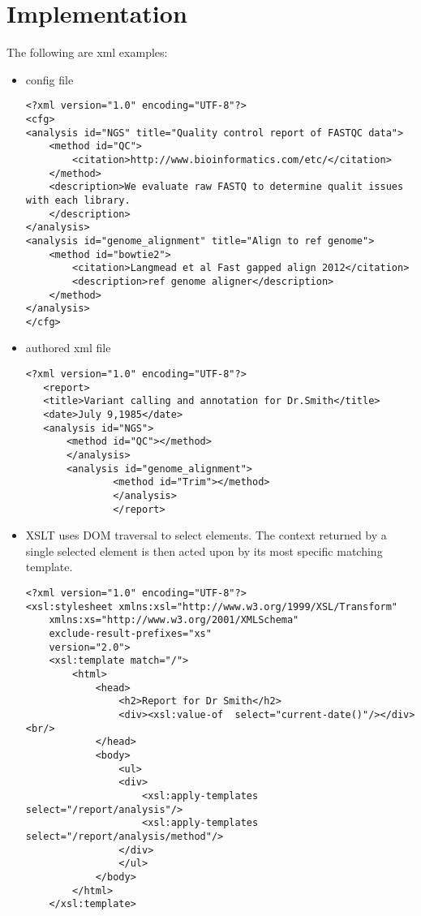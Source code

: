 \documentclass{article}
\begin{document}
\section{Implementation}
The following are xml examples:
\begin{itemize}
\item config file
\begin{lstlisting}
<?xml version="1.0" encoding="UTF-8"?>
<cfg>
<analysis id="NGS" title="Quality control report of FASTQC data">
    <method id="QC">
        <citation>http://www.bioinformatics.com/etc/</citation>
    </method>
    <description>We evaluate raw FASTQ to determine qualit issues with each library.
    </description>
</analysis>
<analysis id="genome_alignment" title="Align to ref genome">
    <method id="bowtie2">
        <citation>Langmead et al Fast gapped align 2012</citation>
        <description>ref genome aligner</description>
    </method>
</analysis>
</cfg>
\end{lstlisting}
\item authored xml file
\begin{lstlisting}
<?xml version="1.0" encoding="UTF-8"?>
   <report>
   <title>Variant calling and annotation for Dr.Smith</title>
   <date>July 9,1985</date>
   <analysis id="NGS">
       <method id="QC"></method>
       </analysis>
       <analysis id="genome_alignment">
               <method id="Trim"></method>
               </analysis>     
               </report>
\end{lstlisting}

\item XSLT uses DOM traversal to select elements.  The context returned by a single selected element is then acted upon by its most specific matching template.
\begin{lstlisting}
<?xml version="1.0" encoding="UTF-8"?>
<xsl:stylesheet xmlns:xsl="http://www.w3.org/1999/XSL/Transform"
    xmlns:xs="http://www.w3.org/2001/XMLSchema"
    exclude-result-prefixes="xs"
    version="2.0">
    <xsl:template match="/">
        <html>
            <head>
                <h2>Report for Dr Smith</h2>
                <div><xsl:value-of  select="current-date()"/></div><br/>
            </head>
            <body>
                <ul>
                <div>
                    <xsl:apply-templates select="/report/analysis"/>
                    <xsl:apply-templates select="/report/analysis/method"/>
                </div>
                </ul>
            </body>
        </html>
    </xsl:template>
    

\end{lstlisting}
\end{itemize}
\end{document}

